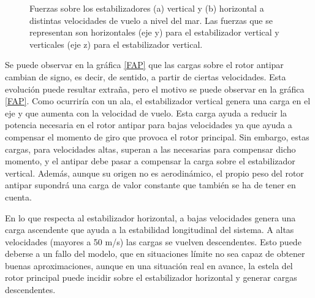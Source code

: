 \begin{figure}
	\centering
	\caption{Fuerzas sobre los estabilizadores (a) vertical y (b) horizontal a distintas velocidades de vuelo a nivel del mar. Las fuerzas que se representan son horizontales (eje y) para el estabilizador vertical y verticales (eje z) para el estabilizador vertical.}
	\label{FE}
\end{figure}


Se puede observar en la gráfica \ref{FAP} que las cargas sobre el rotor antipar cambian de signo, es decir, de sentido, a partir de ciertas velocidades. Esta evolución puede resultar extraña, pero el motivo se puede observar en la gráfica \ref{FAP}. Como ocurriría con un ala, el estabilizador vertical genera una carga en el eje y que aumenta con la velocidad de vuelo. Esta carga ayuda a reducir la potencia necesaria en el rotor antipar para bajas velocidades ya que ayuda a compensar el momento de giro que provoca el rotor principal. Sin embargo, estas cargas, para velocidades altas, superan a las necesarias para compensar dicho momento, y el antipar debe pasar a compensar la carga sobre el estabilizador vertical. Además, aunque su origen no es aerodinámico, el propio peso del rotor antipar supondrá una carga de valor constante que también se ha de tener en cuenta.

En lo que respecta al estabilizador horizontal, a bajas velocidades genera una carga ascendente que ayuda a la estabilidad longitudinal del sistema. A altas velocidades (mayores a 50 m/s) las cargas se vuelven descendentes. Esto puede deberse a un fallo del modelo, que en situaciones límite no sea capaz de obtener buenas aproximaciones, aunque en una situación real en avance, la estela del rotor principal puede incidir sobre el estabilizador horizontal y generar cargas descendentes.

